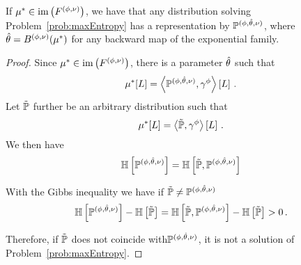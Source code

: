 \begin{theorem}\label{the:maxEntMaxLikeDuality} %
	If $\mu^*\in\mathrm{im}\left(F^{(\phi,\nu)}\right)$, we have that any distribution solving Problem~\ref{prob:maxEntropy} has a representation by $\mathbb{P}^{(\phi,\hat{\theta},\nu)}$, 
	where $\hat{\theta}=B^{(\phi,\nu)}(\mu^*)$ for any backward map of the exponential family. 
%
\end{theorem}
\begin{proof}
	Since $\mu^*\in\mathrm{im}\left(F^{(\phi,\nu)}\right)$, there is a parameter $\hat{\theta}$ such that 
		\[ \mu^*[L] = \left\langle \mathbb{P}^{(\phi,\hat{\theta},\nu)},\gamma^{\phi}\right\rangle \left[ L \right]   \, . \]
	Let $\tilde{\mathbb{P}}$ further be an arbitrary distribution such that
		\[ \mu^*[L] = \left\langle \tilde{\mathbb{P}},\gamma^{\phi}\right\rangle \left[ L \right]  \, . \]
	We then have
	\begin{align*}
		\mathbb{H}\left[\mathbb{P}^{(\phi,\hat{\theta},\nu)}\right]
		= \mathbb{H}\left[\tilde{\mathbb{P}},\mathbb{P}^{(\phi,\hat{\theta},\nu)}\right]
	\end{align*}
	
	With the Gibbs inequality we have if $\tilde{\mathbb{P}}\neq\mathbb{P}^{(\phi,\hat{\theta},\nu)}$
	\begin{align*}
		\mathbb{H}\left[\mathbb{P}^{(\phi,\hat{\theta},\nu)}\right] - \mathbb{H}\left[\tilde{\mathbb{P}}\right]
		= \mathbb{H}\left[\tilde{\mathbb{P}},\mathbb{P}^{(\phi,\hat{\theta},\nu)}\right] - \mathbb{H}\left[\tilde{\mathbb{P}}\right] > 0 \, . 
	\end{align*}	
	
	Therefore, if $\tilde{\mathbb{P}}$ does not coincide with$\mathbb{P}^{(\phi,\hat{\theta},\nu)}$, it is not a solution of Problem~\ref{prob:maxEntropy}.
\end{proof}

